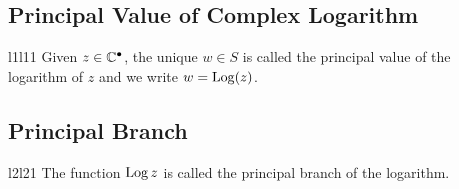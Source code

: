 \documentclass[a4paper]{report}
\begin{document}
\subsection*{Principal Value of Complex Logarithm}

\begin{ocg}{l1}{l1}{1}
    Given \( z \in \mathbb{C}^{\bullet} \), the unique \( w \in S  \) is called the principal value of the logarithm of \( z  \) and we write \( w = \operatorname{Log}(z) \).
\end{ocg}
\newline
{}

\subsection*{Principal Branch}

\begin{ocg}{l2}{l2}{1}
    The function \( \operatorname{Log} z  \) is called the principal branch of the logarithm. 
\end{ocg}
\newline
{}    
\end{document}
